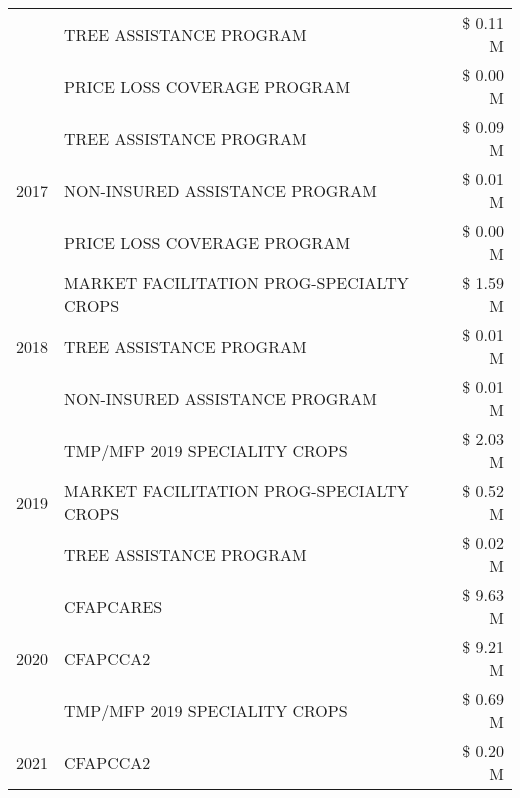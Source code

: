\begin{tabular}{llr}
 & TREE ASSISTANCE PROGRAM & \$ 0.11 M \\
 & PRICE LOSS COVERAGE PROGRAM & \$ 0.00 M \\
\cline{1-3}
\multirow[t]{3}{*}{2017} & TREE ASSISTANCE PROGRAM & \$ 0.09 M \\
 & NON-INSURED ASSISTANCE PROGRAM & \$ 0.01 M \\
 & PRICE LOSS COVERAGE PROGRAM & \$ 0.00 M \\
\cline{1-3}
\multirow[t]{3}{*}{2018} & MARKET FACILITATION PROG-SPECIALTY CROPS & \$ 1.59 M \\
 & TREE ASSISTANCE PROGRAM & \$ 0.01 M \\
 & NON-INSURED ASSISTANCE PROGRAM & \$ 0.01 M \\
\cline{1-3}
\multirow[t]{3}{*}{2019} & TMP/MFP 2019 SPECIALITY CROPS & \$ 2.03 M \\
 & MARKET FACILITATION PROG-SPECIALTY CROPS & \$ 0.52 M \\
 & TREE ASSISTANCE PROGRAM & \$ 0.02 M \\
\cline{1-3}
\multirow[t]{3}{*}{2020} & CFAPCARES & \$ 9.63 M \\
 & CFAPCCA2 & \$ 9.21 M \\
 & TMP/MFP 2019 SPECIALITY CROPS & \$ 0.69 M \\
\cline{1-3}
2021 & CFAPCCA2 & \$ 0.20 M \\
\cline{1-3}
\bottomrule
\end{tabular}
